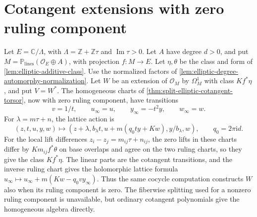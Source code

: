 \section{Cotangent extensions with zero ruling component}
\label{sec:elliptic-zero-ruling-extension}

Let $E=\mathbb C/\Lambda$, with $\Lambda=\mathbb Z+\mathbb Z\tau$ and $\operatorname{Im}\tau>0$. Let $A$ have degree $d>0$, and put $M=\mathbb P_{\mathrm{lines}}(\mathcal O_E\oplus A)$, with projection $f:M\to E$. Let $\eta,\theta$ be the class and form of \cref{lem:elliptic-additive-class}. Use the normalized factors of \cref{lem:elliptic-degree-automorphy-normalization}. Let $W$ be an extension of $\mathcal O_M$ by $\Omega_M^1$ with class $Kf^*\eta$, and put $V=W^*$. The homogeneous charts of \cref{thm:split-elliptic-cotangent-torsor}, now with zero ruling component, have transitions
\[
 v=1/t,\qquad u_\infty=u,\qquad
 y_\infty=-t^2y,\qquad w_\infty=w.
\]
For $\lambda=m\tau+n$, the lattice action is
\[
 (z,t,u,y,w)\longmapsto
 (z+\lambda,b_\lambda t,u+m(q_0ty+Kw),y/b_\lambda,w),
 \qquad q_0=2\pi\mathrm{i}d.
\]
For the local lift differences $z_i-z_j=m_{ij}\tau+n_{ij}$, the zero lifts in these charts differ by $Km_{ij}f^*\theta$ on base overlaps and agree on the two ruling charts, so they give the class $Kf^*\eta$. The linear parts are the cotangent transitions, and the inverse ruling chart gives the holomorphic lattice formula $u_\infty\mapsto u_\infty+m(Kw-q_0v y_\infty)$. Thus the same cocycle computation constructs $W$ also when its ruling component is zero. The fiberwise splitting used for a nonzero ruling component is unavailable, but ordinary cotangent polynomials give the homogeneous algebra directly.

